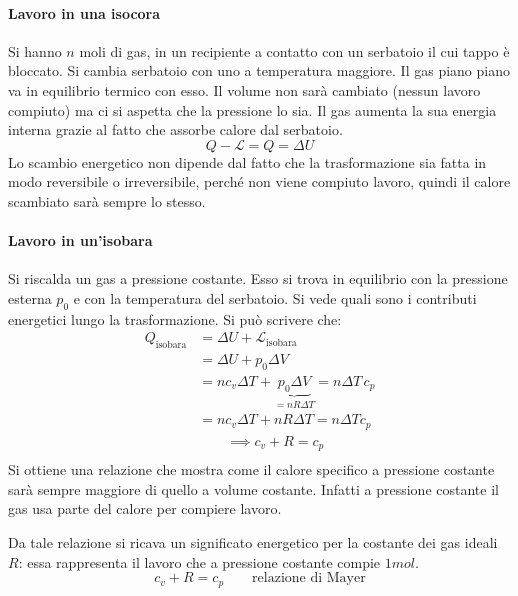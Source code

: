 \documentclass[10pt,a4paper]{book}
\begin{document}
\paragraph{Lavoro in una isocora} Si hanno $n$ moli di gas, in un recipiente a contatto con un serbatoio il cui tappo è bloccato. Si cambia serbatoio con uno a temperatura maggiore. Il gas piano piano va in equilibrio termico con esso. Il volume non sarà cambiato (nessun lavoro compiuto) ma ci si aspetta che la pressione lo sia. Il gas aumenta la sua energia interna grazie al fatto che assorbe calore dal serbatoio.
\[Q-\mathcal{L}=Q=\Delta U\]
Lo scambio energetico non dipende dal fatto che la trasformazione sia fatta in modo reversibile o irreversibile, perché non viene compiuto lavoro, quindi il calore scambiato sarà sempre lo stesso.

\paragraph{Lavoro in un'isobara} Si riscalda un gas a pressione costante. Esso si trova in equilibrio con la pressione esterna $p_0$ e con la temperatura del serbatoio. Si vede quali sono i contributi energetici lungo la trasformazione. Si può scrivere che:
\begin{align*}
	Q_{\text{isobara}} &= \Delta U + \mathcal{L}_{\text{isobara}} \\
		&= \Delta U + p_0\Delta V \\
		&= nc_v\Delta T + \underbrace{p_0\Delta V}_{=nR\Delta T} = n\Delta T\,c_p \tag*{(in un'isobara)} \\
		&= nc_v\Delta T + nR\Delta T = n\Delta T c_p \\
		& \qquad \implies \boxed{c_v + R = c_p  } \\
\end{align*}
Si ottiene una relazione che mostra come il calore specifico a pressione costante sarà sempre maggiore di quello a volume costante. Infatti a pressione costante il gas usa parte del calore per compiere lavoro.

Da tale relazione si ricava un significato energetico per la costante dei gas ideali $R$: essa rappresenta il lavoro che a pressione costante compie $1 mol$.
\[
	\boxed{c_v + R = c_p  }  \qquad \text{relazione di Mayer}
\]
\end{document}
